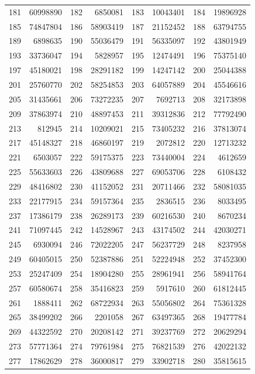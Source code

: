 \begin{longtable}{|r|r|r|r|r|r|r|r|}
181 & 60998890 & 182 & 6850081 & 183 & 10043401 & 184 & 19896928 \\
185 & 74847804 & 186 & 58903419 & 187 & 21152452 & 188 & 63794755 \\
189 & 6898635 & 190 & 55036479 & 191 & 56335097 & 192 & 43801949 \\
193 & 33736047 & 194 & 5828957 & 195 & 12474491 & 196 & 75375140 \\
197 & 45180021 & 198 & 28291182 & 199 & 14247142 & 200 & 25044388 \\
201 & 25760770 & 202 & 58254853 & 203 & 64057889 & 204 & 45546616 \\
205 & 31435661 & 206 & 73272235 & 207 & 7692713 & 208 & 32173898 \\
209 & 37863974 & 210 & 48897453 & 211 & 39312836 & 212 & 77792490 \\
213 & 812945 & 214 & 10209021 & 215 & 73405232 & 216 & 37813074 \\
217 & 45148327 & 218 & 46860197 & 219 & 2072812 & 220 & 12713232 \\
221 & 6503057 & 222 & 59175375 & 223 & 73440004 & 224 & 4612659 \\
225 & 55633603 & 226 & 43809688 & 227 & 69053706 & 228 & 6108432 \\
229 & 48416802 & 230 & 41152052 & 231 & 20711466 & 232 & 58081035 \\
233 & 22177915 & 234 & 59157364 & 235 & 2836515 & 236 & 8033495 \\
237 & 17386179 & 238 & 26289173 & 239 & 60216530 & 240 & 8670234 \\
241 & 71097445 & 242 & 14528967 & 243 & 43174502 & 244 & 42030271 \\
245 & 6930094 & 246 & 72022205 & 247 & 56237729 & 248 & 8237958 \\
249 & 60405015 & 250 & 52387886 & 251 & 52224948 & 252 & 37452300 \\
253 & 25247409 & 254 & 18904280 & 255 & 28961941 & 256 & 58941764 \\
257 & 60580674 & 258 & 35416823 & 259 & 5917610 & 260 & 61812445 \\
261 & 1888411 & 262 & 68722934 & 263 & 55056802 & 264 & 75361328 \\
265 & 38499202 & 266 & 2201058 & 267 & 63497365 & 268 & 19477784 \\
269 & 44322592 & 270 & 20208142 & 271 & 39237769 & 272 & 20629294 \\
273 & 57771364 & 274 & 79761984 & 275 & 76821539 & 276 & 42022132 \\
277 & 17862629 & 278 & 36000817 & 279 & 33902718 & 280 & 35815615 \\

\end{longtable}
